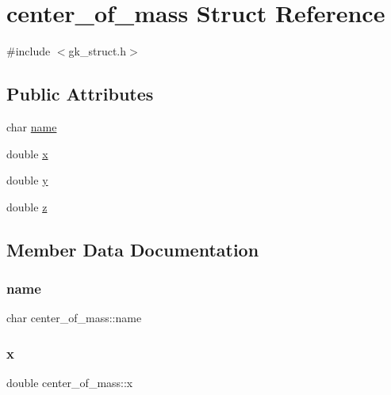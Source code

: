 \hypertarget{structcenter__of__mass}{}\section{center\+\_\+of\+\_\+mass Struct Reference}
\label{structcenter__of__mass}


{\ttfamily \#include $<$gk\+\_\+struct.\+h$>$}

\subsection*{Public Attributes}
\begin{DoxyCompactItemize}
\item 
char \hyperlink{structcenter__of__mass_a2248bac029694a6037c963fe7ffa125c}{name}
\item 
double \hyperlink{structcenter__of__mass_a8b780ea11a3eeab420eca264d8bb7a44}{x}
\item 
double \hyperlink{structcenter__of__mass_a3e8fe055fd621185274f30f256830d90}{y}
\item 
double \hyperlink{structcenter__of__mass_a7dc0bfbcd0169218cefa37050731df2e}{z}
\end{DoxyCompactItemize}


\subsection{Member Data Documentation}
\mbox{\label{structcenter__of__mass_a2248bac029694a6037c963fe7ffa125c}} 
\subsubsection{\texorpdfstring{name}{name}}
{\footnotesize\ttfamily char center\+\_\+of\+\_\+mass\+::name}

\mbox{\label{structcenter__of__mass_a8b780ea11a3eeab420eca264d8bb7a44}} 
\subsubsection{\texorpdfstring{x}{x}}
{\footnotesize\ttfamily double center\+\_\+of\+\_\+mass\+::x}

